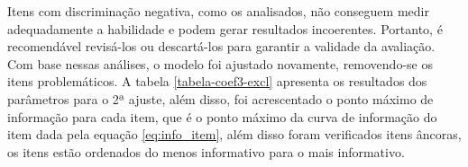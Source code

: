 Itens com discriminação negativa, como os analisados, não conseguem medir adequadamente a habilidade e podem gerar resultados incoerentes. Portanto, é recomendável revisá-los ou descartá-los para garantir a validade da avaliação. Com base nessas análises, o modelo foi ajustado novamente, removendo-se os itens problemáticos. A tabela \ref{tabela-coef3-excl} apresenta os resultados dos parâmetros para o 2ª ajuste, além disso, foi acrescentado o ponto máximo de informação para cada item, que é o ponto máximo da curva de informação do item  dada pela equação \ref{eq:info_item}, além disso foram verificados itens âncoras, os itens estão ordenados do menos informativo para o mais informativo.



\begin{table}[!hbt]
\end{table}
